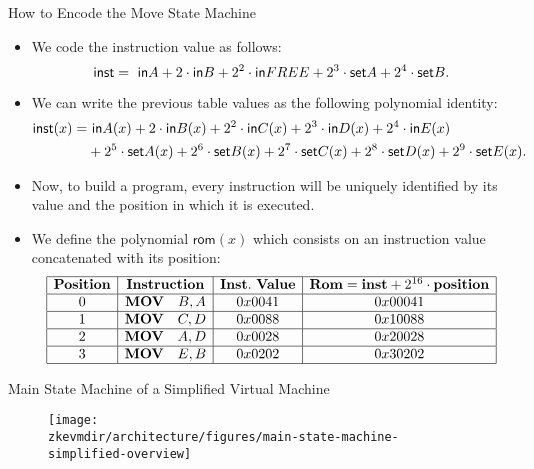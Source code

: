 \begin{frame}[allowframebreaks]{How to Encode the Move State Machine}
\normalsize
\begin{itemize}
\item We code the instruction value as follows:
\[
\mathsf{inst} = ~\mathsf{in} A + 2 \cdot \mathsf{in} B + 2^2 \cdot \mathsf{in} FREE + 2^3 \cdot \mathsf{set} A + 2^4 \cdot \mathsf{set} B.
\]

\item We can write the previous table values as the following polynomial identity:
\begin{align*}
\mathsf{inst}(x) = &~\mathsf{in} A(x) + 2 \cdot \mathsf{in} B(x) + 2^2 \cdot \mathsf{in} C(x) + 2^3 \cdot \mathsf{in} D(x) + 2^4 \cdot \mathsf{in} E(x) \\
& + 2^5 \cdot \mathsf{set} A(x) + 2^6 \cdot \mathsf{set} B(x) + 2^7 \cdot \mathsf{set} C(x) + 2^8 \cdot \mathsf{set} D(x) + 2^9 \cdot \mathsf{set} E(x).
\end{align*}

\item Now, to build a program, every instruction will be uniquely identified by its value and the position in which it is executed.
\item We define the polynomial $\mathsf{rom}(x)$ which consists on an instruction value concatenated with its position:
\[
\begin{array}{|c|c|c|c|}
\hline
\mathbf{Position} & \mathbf{Instruction} & \mathbf{Inst.~Value} & \mathbf{Rom} = \mathbf{inst} + 2^{16} \cdot \mathbf{position} \\ \hline
0 & \mathbf{MOV} \quad B, A & 0x0041 & 0x00041 \\ \hline
1 & \mathbf{MOV} \quad C, D & 0x0088 & 0x10088 \\ \hline
2 & \mathbf{MOV} \quad A, D & 0x0028 & 0x20028 \\ \hline
3 & \mathbf{MOV} \quad E, B & 0x0202 & 0x30202 \\ \hline
\end{array}
\]
\end{itemize}
\end{frame}


\begin{frame}{Main State Machine of a Simplified Virtual Machine}
\begin{figure}
	\texttt{[image: \\zkevmdir/architecture/figures/main-state-machine-simplified-overview]}
\end{figure}
\end{frame}
















